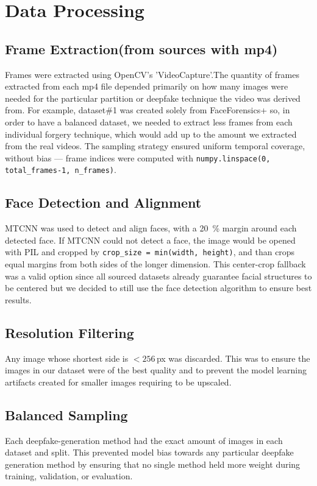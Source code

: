 \documentclass[conference]{IEEEtran}
\begin{document}
\section{Data Processing}
\label{sec:processing}

\subsection{Frame Extraction(from sources with mp4)}
Frames were extracted using OpenCV's 'VideoCapture'.The quantity of frames extracted from each mp4 file depended primarily on how many images were needed for the particular partition or deepfake technique the video was derived from. For example, dataset\#1 was created solely from FaceForensics+ so, in order to have a balanced dataset, we needed to extract less frames from each individual forgery technique, which would add up to the amount we extracted from the real videos. The sampling strategy ensured uniform temporal coverage, without bias — frame indices were computed with \texttt{numpy.linspace(0, total\_frames-1, n\_frames)}.

\subsection{Face Detection and Alignment}
MTCNN \cite{Zhang_2016} was used to detect and align faces, with a 20\, \% margin around each detected face. If MTCNN could not detect a face, the image would be opened with PIL and cropped by \texttt{crop\_size = min(width, height)}, and than crops equal margins from both sides of the longer dimension. This center-crop fallback was a valid option since all sourced datasets already guarantee facial structures to be centered but we decided to still use the face detection algorithm to ensure best results.

\subsection{Resolution Filtering}
Any image whose shortest side is $< 256$\,px was discarded.  This was to ensure the images in our dataset were of the best quality and to prevent the model learning artifacts created for smaller images requiring to be upscaled.

\subsection{Balanced Sampling}
Each deepfake-generation method had the exact amount of images in each dataset and split. This prevented model bias towards any particular deepfake generation method by ensuring that no single method held more weight during training, validation, or evaluation.
\end{document}
